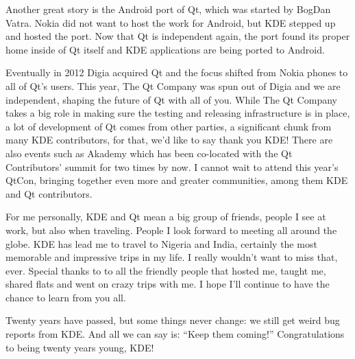 Another great story is the Android port of Qt, which was started by BogDan
Vatra. Nokia did not want to host the work for Android, but KDE stepped up and
hosted the port. Now that Qt is independent again, the port found its proper
home inside of Qt itself and KDE applications are being ported to Android.

Eventually in 2012 Digia acquired Qt and the focus shifted from Nokia phones to
all of Qt's users. This year, The Qt Company was spun out of Digia and we are
independent, shaping the future of Qt with all of you. While The Qt Company
takes a big role in making sure the testing and releasing infrastructure is in
place, a lot of development of Qt comes from other parties, a significant chunk
from many KDE contributors, for that, we'd like to say thank you KDE! There are
also events such as Akademy which has been co-located with the Qt Contributors'
summit for two times by now. I cannot wait to attend this year's QtCon, bringing
together even more and greater communities, among them KDE and Qt contributors.

For me personally, KDE and Qt mean a big group of friends, people I see at work,
but also when traveling. People I look forward to meeting all around the
globe. KDE has lead me to travel to Nigeria and India, certainly the most
memorable and impressive trips in my life. I really wouldn't want to miss
that, ever. Special thanks to to all the friendly people that hosted me,
taught me, shared flats and went on crazy trips with me. I hope I'll
continue to have the chance to learn from you all.

Twenty years have passed, but some things never change: we still get weird bug
reports from KDE. And all we can say is: “Keep them coming!” Congratulations to
being twenty years young, KDE!
